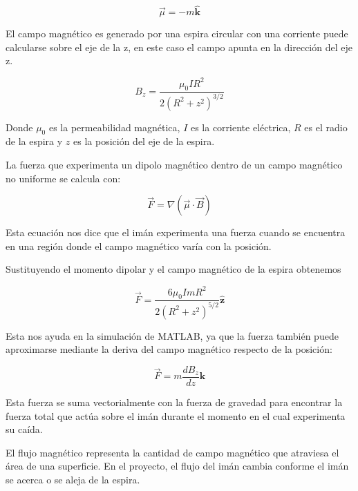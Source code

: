 \begin{equation}
    \vec{\mu} = -m\hat{\mathbf{k}}
\end{equation}


\tab El campo magnético es generado por una espira circular con una corriente puede calcularse sobre el eje de la z, en este caso el campo apunta en la dirección del eje z.

\begin{equation}
    B_z = \frac{\mu_0 I R^2}{2(R^2 + z^2)^{3/2}}
\end{equation}

Donde $\mu_0$ es la permeabilidad magnética, $I$ es la corriente eléctrica, $R$ es el radio de la espira y $z$ es la posición del eje de la espira.


\tab La fuerza que experimenta un dipolo magnético dentro de un campo magnético no uniforme se calcula con:

\begin{equation}
    \vec{F} = \nabla (\vec{\mu} \cdot \vec{B})
\end{equation}

Esta ecuación nos dice que el imán experimenta una fuerza cuando se encuentra en una región donde el campo magnético varía con la posición.

Sustituyendo el momento dipolar y el campo magnético de la espira obtenemos 

\begin{equation}
    \vec{F} = \frac{6\mu_0 I m R^2}{2(R^2 + z^2)^{5/2}} \hat{\mathbf{z}}
\end{equation}

Esta nos ayuda en la simulación de MATLAB, ya que la fuerza también puede aproximarse mediante la deriva del campo magnético respecto de la posición:

\begin{equation}
    \vec{F} = m\frac{dB_z}{dz} \hat{\mathbf{k}}
\end{equation}

Esta fuerza se suma vectorialmente con la fuerza de gravedad para encontrar la fuerza total que actúa sobre el imán durante el momento en el cual experimenta su caída.


\tab El flujo magnético representa la cantidad de campo magnético que atraviesa el área de una superficie. En el proyecto, el flujo del imán cambia conforme el imán se acerca o se aleja de la espira.

